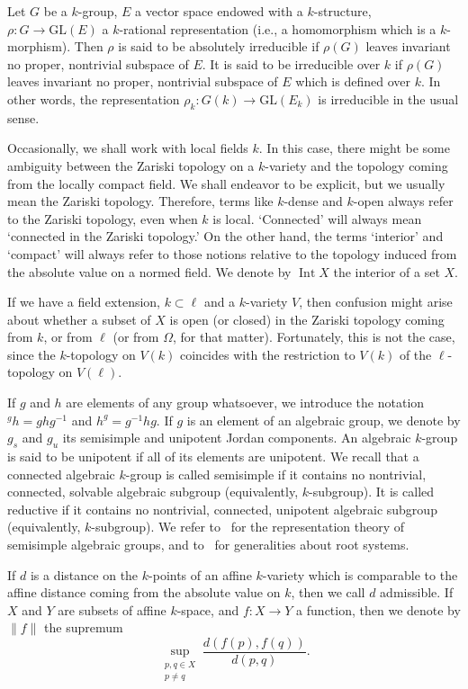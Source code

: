 \documentclass{amsart}
\theoremstyle{plain}
\theoremstyle{definition}
\theoremstyle{remark}
\DeclareMathOperator{\Int}{Int}
\providecommand{\norm}[1]{\lVert#1\rVert}
\begin{document}
Let $G$ be a $k$-group, $E$ a vector space endowed with a $k$-structure, $\rho: G \to
\mathrm{GL}(E)$ a $k$-rational representation (i.e., a homomorphism which is a
$k$-morphism). Then $\rho$ is said to be absolutely irreducible if $\rho(G)$ leaves
invariant no proper, nontrivial subspace of $E$. It is said to be irreducible over
$k$ if $\rho(G)$ leaves invariant no proper, nontrivial subspace of $E$ which is defined
over $k$. In other words, the representation $\rho_{k}: G(k) \to \mathrm{GL}(E_{k})$ is
irreducible in the usual sense.

Occasionally, we shall work with local fields $k$. In this case, there might be some
ambiguity between the Zariski topology on a $k$-variety and the topology coming from the
locally compact field. We shall endeavor to be explicit, but we usually mean the
Zariski topology. Therefore, terms like $k$-dense and $k$-open always refer to the
Zariski topology, even when $k$ is local. `Connected' will always mean `connected in the
Zariski topology.' On the other hand, the terms `interior' and `compact' will always
refer to those notions relative to the topology induced from the absolute value on a
normed field. We denote by $\Int X$ the interior of a set $X$.

If we have a field extension, $k \subset\ell$ and a $k$-variety $V$, then confusion might
arise about whether a subset of $X$ is open (or closed) in the Zariski topology coming
from $k$, or from $\ell$ (or from $\Omega$, for that matter). Fortunately, this is not the
case, since the $k$-topology on $V(k)$ coincides with the restriction to
$V(k)$ of the $\ell$-topology on $V(\ell)$.

If $g$ and $h$ are elements of any group
whatsoever, we introduce the notation $\mbox{}^{g}h = ghg^{-1}$ and $h^{g} = g^{-1}hg$.
If $g$ is an element of an algebraic group, we denote by $g_{s}$ and $g_{u}$ its
semisimple and unipotent Jordan components. An algebraic $k$-group is said to be
unipotent if all of its elements are unipotent.
We recall that a connected algebraic $k$-group is called semisimple if it contains no
nontrivial, connected, solvable algebraic subgroup (equivalently, $k$-subgroup). It is
called reductive if it contains no nontrivial, connected, unipotent algebraic subgroup
(equivalently, $k$-subgroup). We refer to~\cite{MR0277536} for the representation theory
of semisimple algebraic groups, and to~\cite{MR1890629} for generalities about root
systems.

If $d$ is a distance on the $k$-points of an affine $k$-variety which is comparable to the
affine distance coming from the absolute value on $k$, then we call $d$ admissible. If
$X$ and $Y$ are subsets of affine $k$-space, and $f: X \to Y$ a function, then we denote
by $\norm{f}$ the supremum $$\sup_{\substack{p, q \in X\\
p\neq q}}\frac{d(f(p), f(q))}{d(p, q)}.$$
\end{document}
